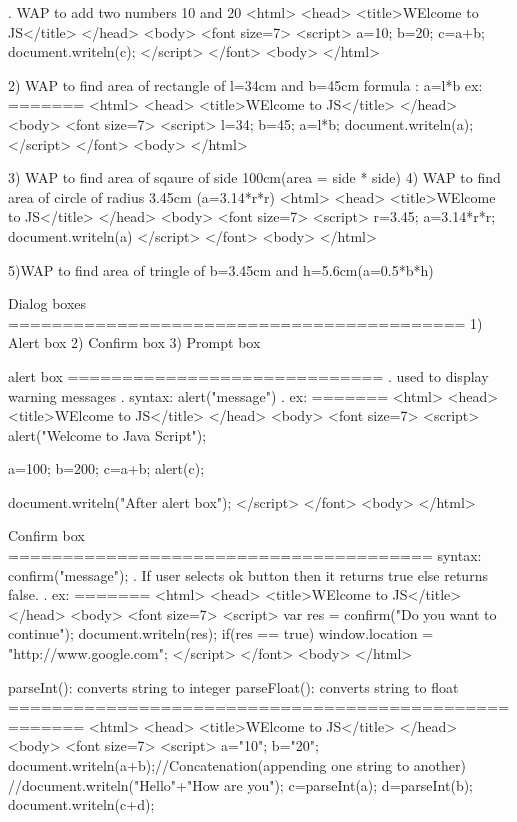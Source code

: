 . WAP to add two numbers 10 and 20
<html>
  <head>
   <title>WElcome to JS</title>
  </head>
  <body>
    <font size=7>
     <script>
		a=10;
		b=20;
		c=a+b;
		document.writeln(c);
	 </script>
	</font>
  <body>
</html>

2) WAP to find area of rectangle of l=34cm and b=45cm
   formula : a=l*b
 ex:
 =======
<html>
  <head>
   <title>WElcome to JS</title>
  </head>
  <body>
    <font size=7>
     <script>
	    l=34;
		b=45;
		a=l*b;
		document.writeln(a);
	 </script>
	</font>
  <body>
</html>

3) WAP to find area of sqaure of side 100cm(area = side * side)
4) WAP to find area of circle of radius 3.45cm (a=3.14*r*r)
<html>
  <head>
   <title>WElcome to JS</title>
  </head>
  <body>
    <font size=7>
     <script>
	   r=3.45;
	   a=3.14*r*r;
	   document.writeln(a)
	 </script>
	</font>
  <body>
</html>

5)WAP to find area of tringle of b=3.45cm and h=5.6cm(a=0.5*b*h)

Dialog boxes
==========================================
1) Alert box
2) Confirm box
3) Prompt box

alert box
=============================
. used to display warning messages
. syntax: alert("message")
. ex:
=======
<html>
  <head>
   <title>WElcome to JS</title>
  </head>
  <body>
    <font size=7>
     <script>
		alert("Welcome to Java Script");
		
		a=100;
		b=200;
		c=a+b;
		alert(c);
		
		document.writeln("After alert box");
	</script>
   </font>
  <body>
</html>

Confirm box
=======================================
syntax: confirm("message");
. If user selects ok button then it returns true else returns false.
. ex:
=======
<html>
  <head>
   <title>WElcome to JS</title>
  </head>
  <body>
    <font size=7>
     <script>
		var res = confirm("Do you want to continue");
		document.writeln(res);
		if(res == true)
		{
			window.location = "http://www.google.com";
	    }
	</script>
   </font>
  <body>
</html>

parseInt(): converts string to integer
parseFloat(): converts string to float
=====================================================
<html>
  <head>
   <title>WElcome to JS</title>
  </head>
  <body>
    <font size=7>
     <script>
		a="10";
		b="20";
		document.writeln(a+b);//Concatenation(appending one string to another)
		//document.writeln("Hello"+"How are you");
		c=parseInt(a);
		d=parseInt(b);
		document.writeln(c+d);

